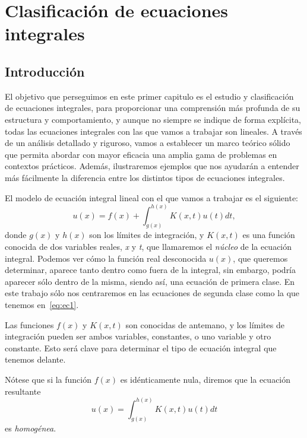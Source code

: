 
\chapter{Clasificación de ecuaciones integrales}\label{ch:primer-capitulo}

\section{Introducción}
El objetivo que perseguimos en este primer capitulo es el estudio y clasificación de ecuaciones integrales, para proporcionar una comprensión más profunda de su estructura y comportamiento, y aunque no siempre se indique de forma explícita, todas las ecuaciones integrales con las que vamos a trabajar son lineales. A través de un análisis detallado y riguroso, vamos a establecer un marco teórico sólido que permita abordar con mayor eficacia una amplia gama de problemas en contextos prácticos. Además, ilustraremos ejemplos que nos ayudarán a entender más fácilmente la diferencia entre los distintos tipos de ecuaciones integrales.

El modelo de ecuación integral lineal con el que vamos a trabajar es el siguiente:
\begin{equation}\label{eq:ec1}
	u(x) = f(x) + \int_{g(x)}^{h(x)} K(x,t)u(t)dt,
\end{equation}
donde $g(x)$ y $h(x)$ son los límites de integración, y $K(x,t)$ es una función conocida de dos variables reales, \textit{x} y \textit{t}, que llamaremos el \textit{núcleo} de la ecuación integral. Podemos ver cómo la función real desconocida $u(x)$, que queremos determinar,  aparece tanto dentro como fuera de la integral, sin embargo, podría aparecer sólo dentro de la misma, siendo así, una ecuación de primera clase. En este trabajo sólo nos centraremos en las ecuaciones de segunda clase como la que tenemos en~\eqref{eq:ec1}.

Las funciones $f(x)$ y $K(x,t)$ son conocidas de antemano, y los límites de integración pueden ser ambos variables, constantes, o uno variable y otro constante. Esto será clave para determinar el tipo de ecuación integral que tenemos delante.\\
\begin{observacion}
	Nótese que si la función $f(x)$ es idénticamente nula, diremos que la ecuación resultante 
	\begin{equation}\label{}
		u(x) = \int_{g(x)}^{h(x)} K(x,t)u(t)dt
	\end{equation}
	es \textit{homogénea}.
\end{observacion}

